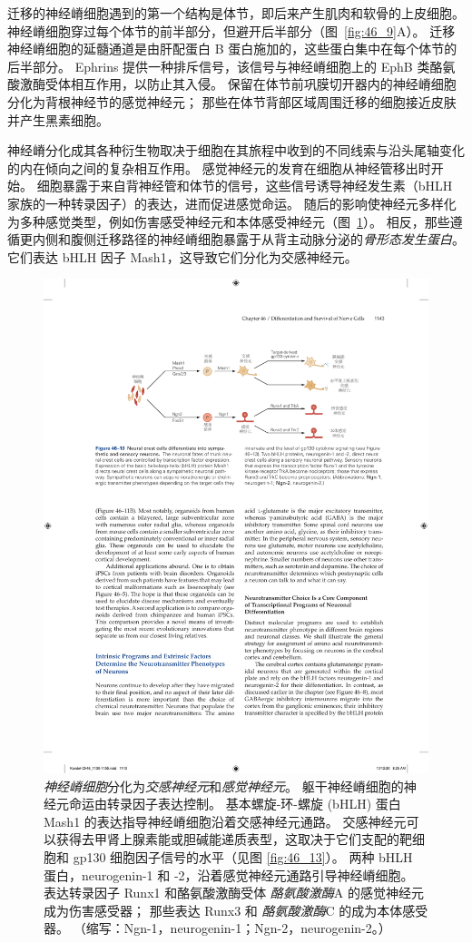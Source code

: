 迁移的神经嵴细胞遇到的第一个结构是体节，即后来产生肌肉和软骨的上皮细胞。
神经嵴细胞穿过每个体节的前半部分，但避开后半部分（图~\ref{fig:46_9}A）。
迁移神经嵴细胞的延髓通道是由肝配蛋白 B 蛋白施加的，这些蛋白集中在每个体节的后半部分。
Ephrins 提供一种排斥信号，该信号与神经嵴细胞上的 EphB 类酪氨酸激酶受体相互作用，以防止其入侵。
保留在体节前巩膜切开器内的神经嵴细胞分化为背根神经节的感觉神经元；
那些在体节背部区域周围迁移的细胞接近皮肤并产生黑素细胞。


神经嵴分化成其各种衍生物取决于细胞在其旅程中收到的不同线索与沿头尾轴变化的内在倾向之间的复杂相互作用。
感觉神经元的发育在细胞从神经管移出时开始。
细胞暴露于来自背神经管和体节的信号，这些信号诱导神经发生素（bHLH 家族的一种转录因子）的表达，进而促进感觉命运。
随后的影响使神经元多样化为多种感觉类型，例如伤害感受神经元和本体感受神经元（图~\ref{fig:46_10}）。
相反，那些遵循更内侧和腹侧迁移路径的神经嵴细胞暴露于从背主动脉分泌的\textit{骨形态发生蛋白}。
它们表达 bHLH 因子 Mash1，这导致它们分化为交感神经元。


\begin{figure}[htbp]
	\centering
	\includegraphics[width=0.85\linewidth]{chap46/fig_46_10}
	\caption{\textit{神经嵴细胞}分化为\textit{交感神经元}和\textit{感觉神经元}。
		躯干神经嵴细胞的神经元命运由转录因子表达控制。
		基本螺旋-环-螺旋 (bHLH) 蛋白 Mash1 的表达指导神经嵴细胞沿着交感神经元通路。
		交感神经元可以获得去甲肾上腺素能或胆碱能递质表型，这取决于它们支配的靶细胞和 gp130 细胞因子信号的水平（见图 \ref{fig:46_13}）。
		两种 bHLH 蛋白，neurogenin-1 和 -2，沿着感觉神经元通路引导神经嵴细胞。 表达转录因子 Runx1 和酪氨酸激酶受体 \textit{酪氨酸激酶}A 的感觉神经元成为伤害感受器； 那些表达 Runx3 和 \textit{酪氨酸激酶}C 的成为本体感受器。 （缩写：Ngn-1，neurogenin-1；Ngn-2，neurogenin-2。）}
	\label{fig:46_10}
\end{figure}


